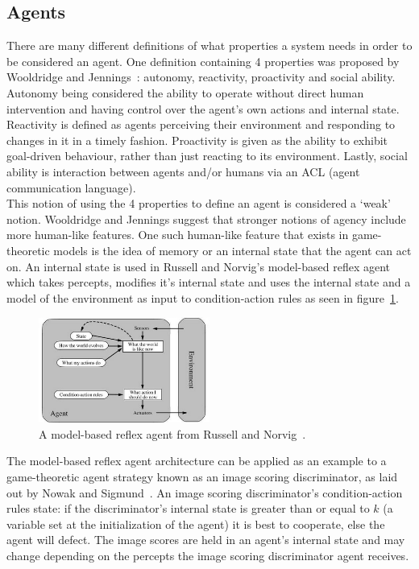 \documentclass[twoside,twocolumn]{article}
\begin{document}
\subsection{Agents}
There are many different definitions of what properties a system needs in order to be considered an agent. One definition containing 4 properties was proposed by Wooldridge and Jennings~\cite{wooldridge_jennings_1995}: autonomy, reactivity, proactivity and social ability.\\
Autonomy being considered the ability to operate without direct human intervention and having control over the agent's own actions and internal state. Reactivity is defined as agents perceiving their environment and responding to changes in it in a timely fashion. Proactivity is given as the ability to exhibit goal-driven behaviour, rather than just reacting to its environment. Lastly, social ability is interaction between agents and/or humans via an ACL (agent communication language).\\
This notion of using the 4 properties to define an agent is considered a `weak' notion. Wooldridge and Jennings suggest that stronger notions of agency include more human-like features. One such human-like feature that exists in game-theoretic models is the idea of memory or an internal state that the agent can act on. An internal state is used in Russell and Norvig's model-based reflex agent which takes percepts, modifies it's internal state and uses the internal state and a model of the environment as input to condition-action rules as seen in figure~\ref{fig:model_reflex}.
\begin{figure}
	\begin{center}
	\includegraphics[width=0.5\textwidth]{RuNorv.png}
	\caption{A model-based reflex agent from Russell and Norvig~\cite{russell2016artificial}.}
	\label{fig:model_reflex}
	\end{center}
\end{figure}
\noindent The model-based reflex agent architecture can be applied as an example to a game-theoretic agent strategy known as an image scoring discriminator, as laid out by Nowak and Sigmund~\cite{evol_indirect_image}. An image scoring discriminator's condition-action rules state: if the discriminator's internal state is greater than or equal to $k$ (a variable set at the initialization of the agent) it is best to cooperate, else the agent will defect. The image scores are held in an agent's internal state and may change depending on the percepts the image scoring discriminator agent receives.\\
\end{document}

